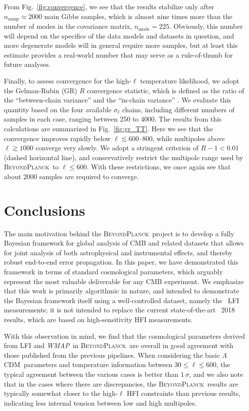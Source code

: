 \documentclass[onecolumn]{aa}
\def\WMAP{\textit{WMAP}}
\def\LCDM{$\Lambda$CDM}
\newcommand{\BP}{\textsc{BeyondPlanck}}
\begin{document}
From Fig.~\ref{fig:convergence}, we see that the results stabilize
only after $n_{\mathrm{samp}}\approx 2000$ main Gibbs samples, which
is almost nine times more than the number of modes in the covariance
matrix, $n_{\mathrm{mode}}=225$. Obviously, this number will depend on
the specifics of the data models and datasets in question, and more
degenerate models will in general require more samples, but at least
this estimate provides a real-world number that may serve as a
rule-of-thumb for future analyses.


Finally, to assess convergence for the high-$\ell$ temperature
likelihood, we adopt the Gelman-Rubin (GR) $R$ convergence statistic,
which is defined as the ratio of the ``between-chain variance'' and
the ``in-chain variance'' \citep{gelman:1992}. We evaluate this
quantity based on the four available $\sigma_{\ell}$ chains, including
different numbers of samples in each case, ranging between 250 to
4000. The results from this calculations are summarized in
Fig.~\ref{fig:gr_TT}. Here we see that the convergence improves
rapidly below $\ell\lesssim600$--800, while multipoles above
$\ell\gtrsim 1000$ converge very slowly. We adopt a stringent
criterion of $R-1 < 0.01$ (dashed horizontal line), and conservatively
restrict the multipole range used by \BP\ to $\ell\le600$. With these
restrictions, we once again see that about 2000 samples are required
to converge.

\section{Conclusions}
\label{sec:conclusions}

The main motivation behind the \BP\ project is to develop a fully
Bayesian framework for global analysis of CMB and related datasets
that allows for joint analysis of both astrophysical and instrumental
effects, and thereby robust end-to-end error propagation. In this
paper, we have demonstrated this framework in terms of standard
cosmological parameters, which arguably represent the most valuable
deliverable for any CMB experiment. We emphasize that this work is
primarily algorithmic in nature, and intended to demonstrate the
Bayesian framework itself using a well-controlled dataset, namely the
\Planck\ LFI measurements; it is not intended to replace the current
state-of-the-art \Planck\ 2018 results, which are based on
high-sensitivity HFI measurements.

With this observation in mind, we find that the cosmological
parameters derived from LFI and \WMAP\ in \BP\ are overall in good
agreement with those published from the previous pipelines. When
considering the basic \LCDM\ parameters and temperature information
between $30\le\ell\le600$, the typical agreement between the various
cases is better than $1\,\sigma$, and we also note that in the cases
where there are discrepancies, the \BP\ results are typically somewhat
closer to the high-$\ell$ HFI constraints than previous results,
indicating less internal tension between low and high multipoles.
\end{document}
